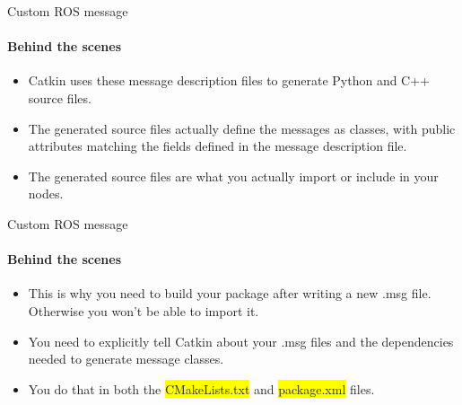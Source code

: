 \documentclass{beamer}
\begin{document}
\begin{frame}{Custom ROS message}
    \framesubtitle{Behind the scenes}  
    
    \begin{itemize}
        
        \item Catkin uses these message description files to generate Python and C++ source files.
        \vspace{0.5cm}
        \item The generated source files actually define the messages as classes, with public attributes matching the fields defined in the message description file.
        \vspace{0.5cm}        
       
        \item The generated source files are what you actually import or include in your nodes.
    
\end{itemize}
\end{frame}


\begin{frame}{Custom ROS message}
    \framesubtitle{Behind the scenes}  
    
    \begin{itemize}
        
        \item This is why you need to build your package after writing a new  {\ttfamily \colorbox{gray!30!white}{.msg}} file. Otherwise you won't be able to import it.
        \vspace{0.5cm}
        \item You need to explicitly tell Catkin about your {\ttfamily \colorbox{gray!30!white}{.msg}} files and the dependencies needed to generate message classes.
        \vspace{0.5cm} 
        \item You do that in both the {\ttfamily \colorbox{yellow}{CMakeLists.txt}} and {\ttfamily \colorbox{yellow}{package.xml}} files.
        
    \end{itemize}
\end{frame}

    
\end{document}
